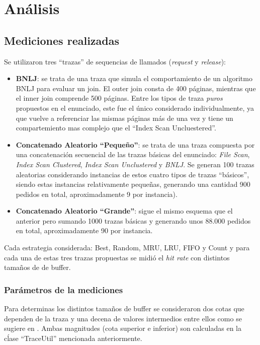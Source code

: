 \section{An\'alisis}

\subsection{Mediciones realizadas}
Se utilizaron tres ``trazas'' de sequencias de llamados (\textit{request} y \textit{release}):   
\begin{itemize}
\item \textbf{BNLJ}: se trata de una traza que simula el comportamiento de un algoritmo BNLJ para evaluar un join. 
El outer join consta de 400 p\'aginas, mientras que el inner join comprende 500 p\'aginas. 
Entre los tipos de traza \textit{puros} propuestos en el enunciado, este fue el \'unico considerado individualmente, 
ya que vuelve a referenciar las mismas p\'aginas m\'as de una vez y tiene un compartemiento mas complejo que 
el ``Index Scan Uncluestered''. 
\item \textbf{Concatenado Aleatorio ``Peque\~no''}: se trata de una traza compuesta por una concatenaci\'on secuencial de 
las trazas b\'asicas del enunciado: \textit{File Scan}, \textit{Index Scan Clustered}, \textit{Index Scan Unclustered} 
y \textit{BNLJ}. Se generan 100 trazas aleatorias considerando instancias de estos cuatro tipos de trazas ``b\'asicos'',
siendo estas instancias relativamente pequeñas, generando una cantidad 900 pedidos en total, aproximadamente 9 por instancia). 
\item \textbf{Concatenado Aleatorio ``Grande''}: sigue el mismo esquema que el anterior pero sumando 1000 trazas b\'asicas y
generando unos 88.000 pedidos en total, aproximadamente 90 por instancia.
\end{itemize}

Cada estrategia considerada: Best, Random, MRU, LRU, FIFO y Count y para cada una de estas tres trazas propuestas se
midi\'o el \textit{hit rate} con distintos tama\~nos de de buffer. 

\subsubsection{Par\'ametros de la mediciones}
Para determinas los distintos tama\~nos de buffer se consideraron dos cotas que dependen de la traza y una decena de valores
intermedios entre ellos como se sugiere en \cite{eff84}. Ambas magnitudes (cota superior e inferior) son calculadas en la cĺase ``TraceUtil''
mencionada anteriormente.

